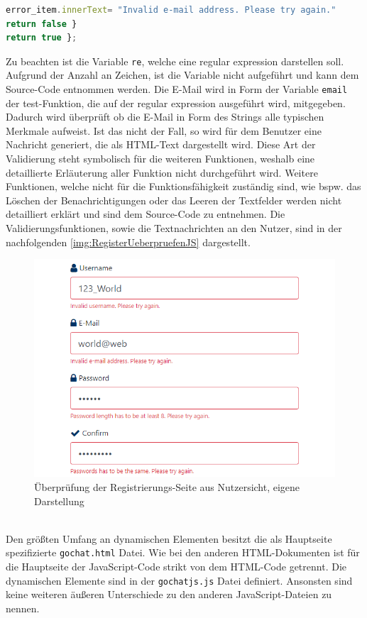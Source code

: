 \documentclass[a4paper,titlepage,halfparskip,12pt]{scrreprt}
\begin{document}
\begin{onehalfspacing}
\begin{lstlisting}[language=Javascript,caption=Validierungsfunktion \texttt{validateEmail()},label={lst:RegisterValidateFunction}]
error_item.innerText= "Invalid e-mail address. Please try again."
return false }
return true };
\end{lstlisting}
Zu beachten ist die Variable \texttt{re}, welche eine regular expression darstellen soll. Aufgrund der Anzahl an Zeichen, ist die Variable nicht aufgeführt und kann dem Source-Code entnommen werden. Die E-Mail wird in Form der Variable \texttt{email} der test-Funktion, die auf der regular expression ausgeführt wird, mitgegeben. Dadurch wird überprüft ob die E-Mail in Form des Strings alle typischen Merkmale aufweist. Ist das nicht der Fall, so wird für dem Benutzer eine Nachricht generiert, die als \ac{HTML}-Text dargestellt wird. Diese Art der Validierung steht symbolisch für die weiteren Funktionen, weshalb eine detaillierte Erläuterung aller Funktion nicht durchgeführt wird. Weitere Funktionen, welche nicht für die Funktionsfähigkeit zuständig sind, wie bspw. das Löschen der Benachrichtigungen oder das Leeren der Textfelder werden nicht detailliert erklärt und sind dem Source-Code zu entnehmen. Die Validierungsfunktionen, sowie die Textnachrichten an den Nutzer, sind in der nachfolgenden \autoref{img:RegisterUeberpruefenJS} dargestellt.
\begin{figure}[h]
	\centering
	\includegraphics[scale=0.8]{images/RegisterUeberpruefenJS}
	\caption{Überprüfung der Registrierungs-Seite aus Nutzersicht, eigene Darstellung}
	\label{img:RegisterUeberpruefenJS}
\end{figure}\\
Den größten Umfang an dynamischen Elementen besitzt die als Hauptseite spezifizierte \texttt{gochat.html} Datei. Wie bei den anderen HTML-Dokumenten ist für die Hauptseite der JavaScript-Code strikt von dem HTML-Code getrennt. Die dynamischen Elemente sind in der \texttt{gochatjs.js} Datei definiert. Ansonsten sind keine weiteren äußeren Unterschiede zu den anderen JavaScript-Dateien zu nennen. 

\end{onehalfspacing}
\end{document}
